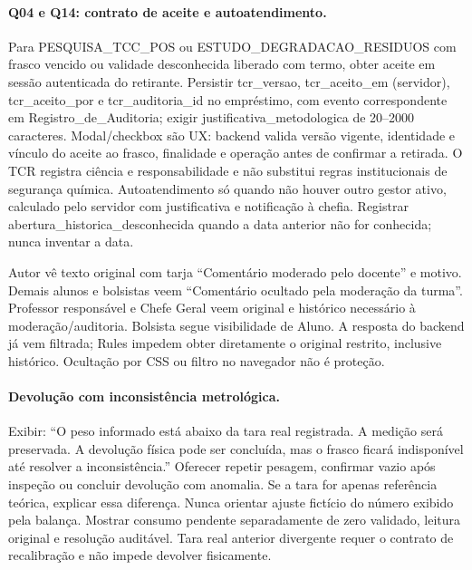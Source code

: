 \paragraph{Q04 e Q14: contrato de aceite e autoatendimento.}
Para PESQUISA\_TCC\_POS ou ESTUDO\_DEGRADACAO\_RESIDUOS com frasco vencido ou validade desconhecida liberado com termo, obter aceite em sessão autenticada do retirante. Persistir tcr\_versao, tcr\_aceito\_em (servidor), tcr\_aceito\_por e tcr\_auditoria\_id no empréstimo, com evento correspondente em Registro\_de\_Auditoria; exigir justificativa\_metodologica de 20--2000 caracteres. Modal/checkbox são UX: backend valida versão vigente, identidade e vínculo do aceite ao frasco, finalidade e operação antes de confirmar a retirada. O TCR registra ciência e responsabilidade e não substitui regras institucionais de segurança química. Autoatendimento só quando não houver outro gestor ativo, calculado pelo servidor com justificativa e notificação à chefia. Registrar abertura\_historica\_desconhecida quando a data anterior não for conhecida; nunca inventar a data.

\begin{regra}
Autor vê texto original com tarja ``Comentário moderado pelo docente'' e motivo. Demais alunos e bolsistas veem ``Comentário ocultado pela moderação da turma''. Professor responsável e Chefe Geral veem original e histórico necessário à moderação/auditoria. Bolsista segue visibilidade de Aluno. A resposta do backend já vem filtrada; Rules impedem obter diretamente o original restrito, inclusive histórico. Ocultação por CSS ou filtro no navegador não é proteção.
\end{regra}

\paragraph{Devolução com inconsistência metrológica.}
Exibir: ``O peso informado está abaixo da tara real registrada. A medição será preservada. A devolução física pode ser concluída, mas o frasco ficará indisponível até resolver a inconsistência.'' Oferecer repetir pesagem, confirmar vazio após inspeção ou concluir devolução com anomalia. Se a tara for apenas referência teórica, explicar essa diferença. Nunca orientar ajuste fictício do número exibido pela balança. Mostrar consumo pendente separadamente de zero validado, leitura original e resolução auditável. Tara real anterior divergente requer o contrato de recalibração e não impede devolver fisicamente.

